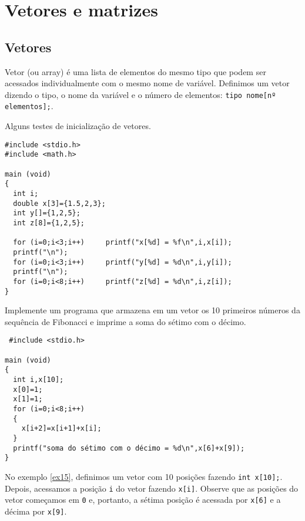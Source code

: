 
\chapter{Vetores e matrizes}
\section{Vetores}
Vetor (ou array) é uma lista de elementos do mesmo tipo que podem ser acessados individualmente com o mesmo nome de variável. Definimos um vetor dizendo o tipo, o nome da variável e o número de elementos: \verb|tipo nome[nº elementos];|.
\begin{ex}\label{ex15.0}Alguns testes de inicialização de vetores.
\end{ex}
\begin{verbatim}
#include <stdio.h>
#include <math.h>

main (void)
{
  int i;
  double x[3]={1.5,2,3};
  int y[]={1,2,5};
  int z[8]={1,2,5};

  for (i=0;i<3;i++)     printf("x[%d] = %f\n",i,x[i]);
  printf("\n");
  for (i=0;i<3;i++)     printf("y[%d] = %d\n",i,y[i]);
  printf("\n");
  for (i=0;i<8;i++)     printf("z[%d] = %d\n",i,z[i]);
} 
\end{verbatim}


\begin{ex}\label{ex15}Implemente um programa que armazena em um vetor os 10 primeiros números da sequência de Fibonacci e imprime a soma do sétimo com o décimo.
\end{ex}
\begin{verbatim}
 #include <stdio.h>

main (void)
{
  int i,x[10];
  x[0]=1;
  x[1]=1;
  for (i=0;i<8;i++)
  {
    x[i+2]=x[i+1]+x[i];
  }
  printf("soma do sétimo com o décimo = %d\n",x[6]+x[9]);
}
\end{verbatim}
No exemplo \ref{ex15}, definimos um vetor com 10 posições fazendo \verb|int x[10];|. Depois, acessamos a posição \verb|i| do vetor fazendo \verb|x[i]|. Observe que as posições do vetor começamos em \verb|0| e, portanto, a sétima posição é acessada por \verb|x[6]| e a décima por \verb|x[9]|.

